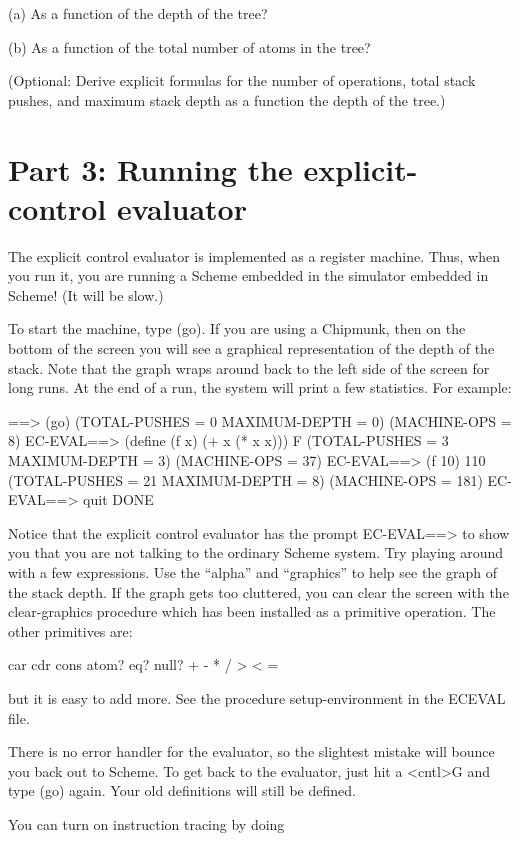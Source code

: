 (a) As a function of the depth of the tree?

(b) As a function of the total number of atoms in the tree?

(Optional: Derive explicit formulas for the number of operations, total stack
pushes, and maximum stack depth as a function the depth of the tree.)

\section{Part 3:  Running the explicit-control evaluator}

The explicit control evaluator is implemented as a register machine.
Thus, when you run it, you are running a {\sc Scheme} embedded in the
simulator embedded in {\sc Scheme}! (It will be slow.)

To start the machine, type {\cf (go)}. If you are using a Chipmunk,
then on the bottom of the screen you will see a graphical
representation of the depth of the stack. Note that the graph wraps
around back to the left side of the screen for long runs.  At the end of a run,
the system will print a few statistics. For example:

\beginlisp
==> (go)
(TOTAL-PUSHES = 0 MAXIMUM-DEPTH = 0)
(MACHINE-OPS = 8)
\null
EC-EVAL==> (define (f x) (+ x (* x x)))
F
(TOTAL-PUSHES = 3 MAXIMUM-DEPTH = 3)
(MACHINE-OPS = 37)
\null
EC-EVAL==> (f 10)
110
(TOTAL-PUSHES = 21 MAXIMUM-DEPTH = 8)
(MACHINE-OPS = 181)
\null
EC-EVAL==> quit
DONE
\endlisp

Notice that the explicit control evaluator has the prompt {\cf
EC-EVAL==>} to show you that you are not talking to the ordinary
{\sc Scheme} system. Try playing around with a few expressions. Use the
``alpha'' and ``graphics'' to help see the graph of the stack depth.
If the graph gets too cluttered, you can clear the screen with the
{\cf clear-graphics} procedure which has been installed as a primitive
operation. The other primitives are:

\beginlisp
    car cdr cons atom? eq? null? + - * / > < =
\endlisp

but it is easy to add more. See the procedure {\cf setup-environment}
in the {\cf ECEVAL} file.

There is no error handler for the evaluator, so the slightest mistake
will bounce you back out to {\sc Scheme}. To get back to the evaluator, just
hit a {\cf <cntl>G} and type {\cf (go)} again. Your old definitions
will still be defined.

You can turn on instruction tracing by doing

